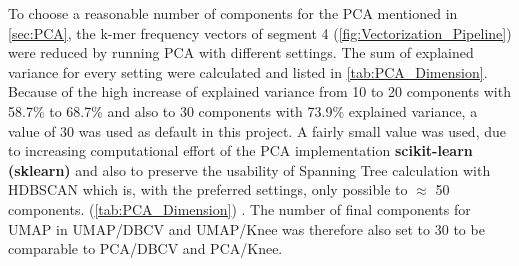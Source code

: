 To choose a reasonable number of components for the \gls{PCA} mentioned in \autoref{sec:PCA}, the k-mer frequency vectors of segment 4 (\autoref{fig:Vectorization_Pipeline}) were reduced by running \gls{PCA} with different settings. The sum of explained variance for every setting were calculated and listed in \autoref{tab:PCA_Dimension}. Because of the high increase of explained variance from 10 to 20 components with 58.7\% to 68.7\% and also to 30 components with 73.9\% explained variance, a value of 30 was used as default in this project. A fairly small value was used, due to increasing computational effort of the \gls{PCA} implementation \textbf{scikit-learn (sklearn)} and also to preserve the usability of Spanning Tree calculation with \gls{HDBSCAN} which is, with the preferred settings, only possible to $\approx$ 50 components. (\autoref{tab:PCA_Dimension}) \autocite{mcinnes_hdbscan_2017, scipy_10_contributors_scipy_2020}. The number of final components for \gls{UMAP} in \acrshort{UMAP}/\acrshort{DBCV} and \acrshort{UMAP}/Knee was therefore also set to 30 to be comparable to \acrshort{PCA}/\acrshort{DBCV} and \acrshort{PCA}/Knee.

\begin{table}[!hbt]
    \centering
    \caption[Explained Variance by different PCA settings]{\textbf{Explained Variance by different PCA settings.} The explained variance of specific \gls{PCA} settings used on the k-mer frequency vectors of segment 4. A result of 0.587 as for 10 components represents 58.7\% of the variance is explained by the first 10 components of the vector. The more components are extracted the lower the increase in additional explained variance \autocite{pearson_liii_1901}.}
    \label{tab:PCA_Dimension}
\end{table}

